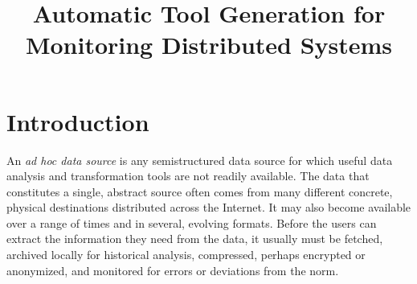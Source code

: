 \documentclass[nocopyrightspace]{sigplanconf}
\begin{document}
\title{Automatic Tool Generation for Monitoring Distributed Systems}





\maketitle{}

\begin{abstract}  

\end{abstract}


\section {Introduction}
\label{sec:intro}

An {\em ad hoc data source} is any semistructured data source for
which useful data analysis and transformation tools are not readily
available.  The data that constitutes a single, abstract source 
often comes from many different concrete, physical destinations
distributed across the Internet.  It may also become available
over a range of times and in several, evolving formats.
Before the users can extract the information they need from the data,
it usually must be fetched, archived locally for historical analysis, 
compressed, perhaps encrypted or anonymized, and monitored for errors 
or deviations from the norm.
\end{document}
